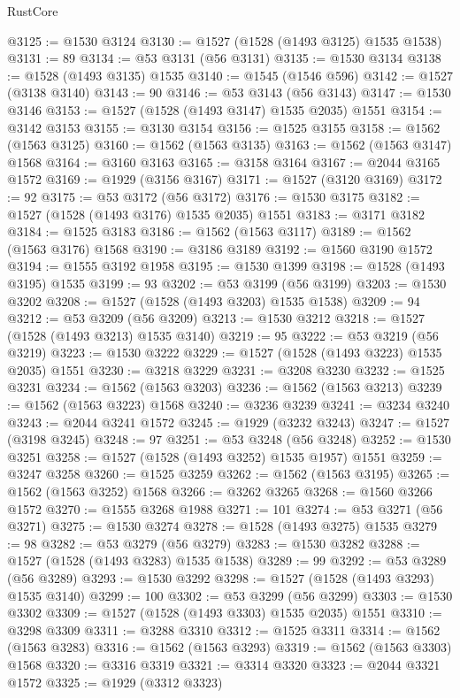 \begin{lexlean}{RustCore}
\begin{coremodule}
@3125 := @1530 @3124
@3130 := @1527 (@1528 (@1493 @3125) @1535 @1538)
@3131 := 89
@3134 := @53 @3131 (@56 @3131)
@3135 := @1530 @3134
@3138 := @1528 (@1493 @3135) @1535
@3140 := @1545 (@1546 @596)
@3142 := @1527 (@3138 @3140)
@3143 := 90
@3146 := @53 @3143 (@56 @3143)
@3147 := @1530 @3146
@3153 := @1527 (@1528 (@1493 @3147) @1535 @2035) @1551
@3154 := @3142 @3153
@3155 := @3130 @3154
@3156 := @1525 @3155
@3158 := @1562 (@1563 @3125)
@3160 := @1562 (@1563 @3135)
@3163 := @1562 (@1563 @3147) @1568
@3164 := @3160 @3163
@3165 := @3158 @3164
@3167 := @2044 @3165 @1572
@3169 := @1929 (@3156 @3167)
@3171 := @1527 (@3120 @3169)
@3172 := 92
@3175 := @53 @3172 (@56 @3172)
@3176 := @1530 @3175
@3182 := @1527 (@1528 (@1493 @3176) @1535 @2035) @1551
@3183 := @3171 @3182
@3184 := @1525 @3183
@3186 := @1562 (@1563 @3117)
@3189 := @1562 (@1563 @3176) @1568
@3190 := @3186 @3189
@3192 := @1560 @3190 @1572
@3194 := @1555 @3192 @1958
@3195 := @1530 @1399
@3198 := @1528 (@1493 @3195) @1535
@3199 := 93
@3202 := @53 @3199 (@56 @3199)
@3203 := @1530 @3202
@3208 := @1527 (@1528 (@1493 @3203) @1535 @1538)
@3209 := 94
@3212 := @53 @3209 (@56 @3209)
@3213 := @1530 @3212
@3218 := @1527 (@1528 (@1493 @3213) @1535 @3140)
@3219 := 95
@3222 := @53 @3219 (@56 @3219)
@3223 := @1530 @3222
@3229 := @1527 (@1528 (@1493 @3223) @1535 @2035) @1551
@3230 := @3218 @3229
@3231 := @3208 @3230
@3232 := @1525 @3231
@3234 := @1562 (@1563 @3203)
@3236 := @1562 (@1563 @3213)
@3239 := @1562 (@1563 @3223) @1568
@3240 := @3236 @3239
@3241 := @3234 @3240
@3243 := @2044 @3241 @1572
@3245 := @1929 (@3232 @3243)
@3247 := @1527 (@3198 @3245)
@3248 := 97
@3251 := @53 @3248 (@56 @3248)
@3252 := @1530 @3251
@3258 := @1527 (@1528 (@1493 @3252) @1535 @1957) @1551
@3259 := @3247 @3258
@3260 := @1525 @3259
@3262 := @1562 (@1563 @3195)
@3265 := @1562 (@1563 @3252) @1568
@3266 := @3262 @3265
@3268 := @1560 @3266 @1572
@3270 := @1555 @3268 @1988
@3271 := 101
@3274 := @53 @3271 (@56 @3271)
@3275 := @1530 @3274
@3278 := @1528 (@1493 @3275) @1535
@3279 := 98
@3282 := @53 @3279 (@56 @3279)
@3283 := @1530 @3282
@3288 := @1527 (@1528 (@1493 @3283) @1535 @1538)
@3289 := 99
@3292 := @53 @3289 (@56 @3289)
@3293 := @1530 @3292
@3298 := @1527 (@1528 (@1493 @3293) @1535 @3140)
@3299 := 100
@3302 := @53 @3299 (@56 @3299)
@3303 := @1530 @3302
@3309 := @1527 (@1528 (@1493 @3303) @1535 @2035) @1551
@3310 := @3298 @3309
@3311 := @3288 @3310
@3312 := @1525 @3311
@3314 := @1562 (@1563 @3283)
@3316 := @1562 (@1563 @3293)
@3319 := @1562 (@1563 @3303) @1568
@3320 := @3316 @3319
@3321 := @3314 @3320
@3323 := @2044 @3321 @1572
@3325 := @1929 (@3312 @3323)

\end{coremodule}
\end{lexlean}
